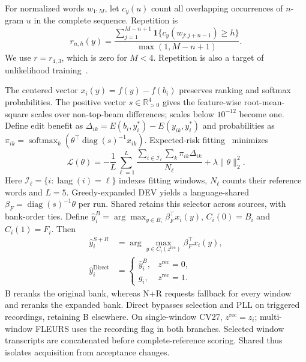 \documentclass[conference,letterpaper]{IEEEtran}
\begin{document}
For normalized words $w_{1:M}$, let $c_y(u)$ count all overlapping occurrences of $n$-gram $u$ in the complete sequence. Repetition is
\begin{equation}
r_{n,h}(y)=\frac{\sum_{j=1}^{M-n+1}\mathbf1\{c_y(w_{j:j+n-1})\ge h\}}{\max(1,M-n+1)}.
\label{eq:repetition}
\end{equation}
We use $r=r_{4,3}$, which is zero for $M<4$. Repetition is also a target of unlikelihood training~\cite{welleck2020}.

The centered vector $x_i(y)=f(y)-f(b_i)$ preserves ranking and softmax probabilities. The positive vector $s\in\mathbb R^4_{>0}$ gives the feature-wise root-mean-square scales over non-top-beam differences; scales below $10^{-12}$ become one. Define edit benefit as $\Delta_{ik}=E(b_i,y_i^*)-E(y_{ik},y_i^*)$ and probabilities as $\pi_{ik}=\operatorname{softmax}_k\!\left(\theta^\top\operatorname{diag}(s)^{-1}x_{ik}\right)$. Expected-risk fitting~\cite{mwer2018} minimizes
\begin{equation}
\mathcal L(\theta)=-\frac1L\sum_{\ell=1}^L\frac{\sum_{i\in\mathcal I_\ell}\sum_k\pi_{ik}\Delta_{ik}}{N_\ell}+\lambda\|\theta\|_2^2.
\label{eq:risk}
\end{equation}
Here $\mathcal I_\ell=\{i:\operatorname{lang}(i)=\ell\}$ indexes fitting windows, $N_\ell$ counts their reference words and $L=5$. Greedy-expanded DEV yields a language-shared $\beta_F=\operatorname{diag}(s)^{-1}\theta$ per run. Shared retains this selector across sources, with bank-order ties. Define $\hat y_i^B=\arg\max_{y\in B_i}\beta_F^\top x_i(y)$, $C_i(0)=B_i$ and $C_i(1)=F_i$. Then
\begin{equation}
\begin{aligned}
\hat y_i^{S+R}&=\arg\max_{y\in C_i(z^{\mathrm{rec}})}\beta_F^\top x_i(y),\\
\hat y_i^{\mathrm{Direct}}&=\begin{cases}\hat y_i^B,&z^{\mathrm{rec}}=0,\\g_i,&z^{\mathrm{rec}}=1.\end{cases}
\end{aligned}\label{eq:accept}
\end{equation}
B reranks the original bank, whereas N+R requests fallback for every window and reranks the expanded bank. Direct bypasses selection and PLL on triggered recordings, retaining B elsewhere. On single-window CV27, $z^{\mathrm{rec}}=z_i$; multi-window FLEURS uses the recording flag in both branches. Selected window transcripts are concatenated before complete-reference scoring. Shared thus isolates acquisition from acceptance changes.
\end{document}
